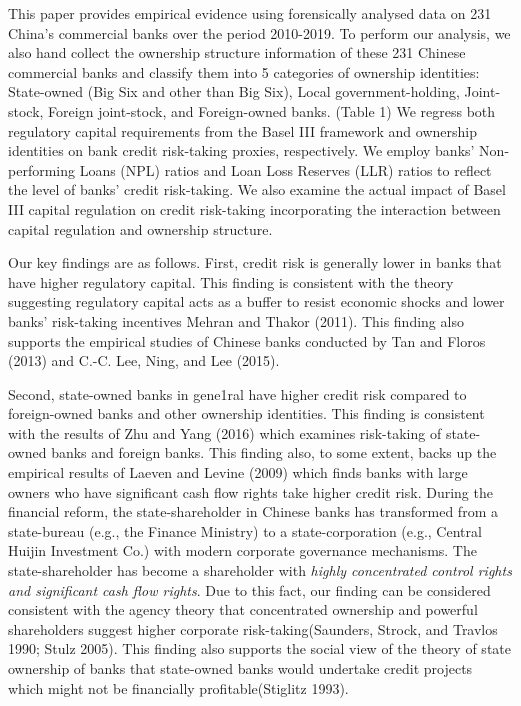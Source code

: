 \documentclass{article}
\begin{document}
This paper provides empirical evidence using forensically analysed data
on 231 China's commercial banks over the period 2010-2019. To perform
our analysis, we also hand collect the ownership structure information
of these 231 Chinese commercial banks and classify them into 5
categories of ownership identities: State-owned (Big Six and other than
Big Six), Local government-holding, Joint-stock, Foreign joint-stock,
and Foreign-owned banks. (Table 1) We regress both regulatory capital
requirements from the Basel III framework and ownership identities on
bank credit risk-taking proxies, respectively. We employ banks'
Non-performing Loans (NPL) ratios and Loan Loss Reserves (LLR) ratios to
reflect the level of banks' credit risk-taking. We also examine the
actual impact of Basel III capital regulation on credit risk-taking
incorporating the interaction between capital regulation and ownership
structure.

Our key findings are as follows. First, credit risk is generally lower
in banks that have higher regulatory capital. This finding is consistent
with the theory suggesting regulatory capital acts as a buffer to resist
economic shocks and lower banks' risk-taking incentives Mehran and
Thakor (2011). This finding also supports the empirical studies of
Chinese banks conducted by Tan and Floros (2013) and C.-C. Lee, Ning,
and Lee (2015).

Second, state-owned banks in gene1ral have higher credit risk compared
to foreign-owned banks and other ownership identities. This finding is
consistent with the results of Zhu and Yang (2016) which examines
risk-taking of state-owned banks and foreign banks. This finding also,
to some extent, backs up the empirical results of Laeven and Levine
(2009) which finds banks with large owners who have significant cash
flow rights take higher credit risk. During the financial reform, the
state-shareholder in Chinese banks has transformed from a state-bureau
(e.g., the Finance Ministry) to a state-corporation (e.g., Central
Huijin Investment Co.) with modern corporate governance mechanisms. The
state-shareholder has become a shareholder with \emph{highly
concentrated control rights and significant cash flow rights}. Due to
this fact, our finding can be considered consistent with the agency
theory that concentrated ownership and powerful shareholders suggest
higher corporate risk-taking(Saunders, Strock, and Travlos 1990; Stulz
2005). This finding also supports the social view of the theory of state
ownership of banks that state-owned banks would undertake credit
projects which might not be financially profitable(Stiglitz 1993).
\end{document}
